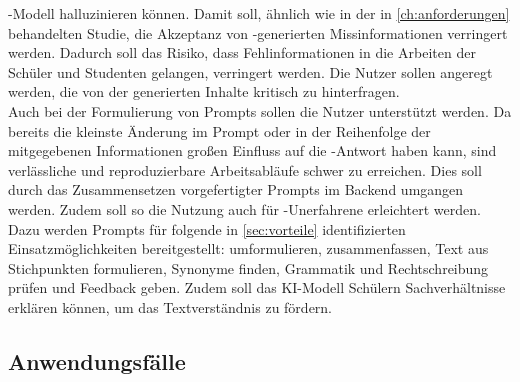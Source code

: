 \documentclass[../main.tex]{subfiles}
\begin{document}
-Modell halluzinieren können. Damit soll, ähnlich wie in der in \autoref{ch:anforderungen} behandelten Studie, die Akzeptanz von -generierten Missinformationen verringert werden. Dadurch 
soll das Risiko, dass Fehlinformationen in die Arbeiten der Schüler und Studenten gelangen, verringert werden. Die Nutzer sollen angeregt werden, die von der  generierten Inhalte 
kritisch zu hinterfragen.\\
Auch bei der Formulierung von Prompts sollen die Nutzer unterstützt werden. Da bereits die kleinste Änderung im Prompt oder in der Reihenfolge der mitgegebenen Informationen großen 
Einfluss auf die -Antwort haben kann, sind verlässliche und reproduzierbare Arbeitsabläufe schwer zu erreichen\cite{creativeWriting}. Dies soll durch das Zusammensetzen vorgefertigter 
Prompts im Backend umgangen werden. Zudem soll so die Nutzung auch für -Unerfahrene erleichtert werden. Dazu werden Prompts für folgende in \autoref{sec:vorteile} identifizierten 
Einsatzmöglichkeiten bereitgestellt: umformulieren, zusammenfassen, Text aus Stichpunkten formulieren, Synonyme finden, Grammatik und Rechtschreibung prüfen und Feedback geben. Zudem soll das KI-Modell
Schülern Sachverhältnisse erklären können, um das Textverständnis zu fördern. 


\subsection{Anwendungsfälle}
\end{document}
